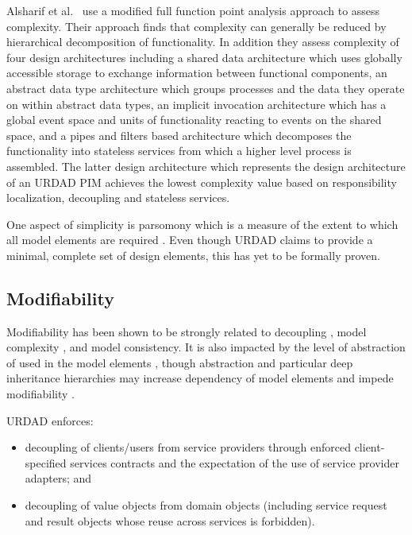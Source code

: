 Alsharif et al.\ \cite{alsharif_2004:complexityOfSoftwareArchitectures} use a modified full function point analysis approach to assess complexity. Their approach finds that complexity can generally be reduced by hierarchical decomposition of functionality. In addition they assess complexity of four design architectures including a shared data architecture which uses globally accessible storage to exchange information between functional components, an abstract data type architecture which groups processes and the data they operate on within abstract data types, an implicit invocation architecture which has a global event space and units of functionality reacting to events on the shared space, and a pipes and filters based architecture which decomposes the functionality into stateless services from which a higher level process is assembled. The latter design architecture which represents the design architecture of an URDAD PIM achieves the lowest complexity value based on responsibility localization, decoupling and stateless services.

One aspect of simplicity is parsomony which is a measure of the extent to which all model elements are required \cite{mohagheghi_2008:overviewOfQualityFrameworks}. Even though URDAD claims to provide a minimal, complete set of design elements, this has yet to be formally proven.


\subsection{Modifiability}

Modifiability has been shown to be strongly related to decoupling
\cite{reynoso_2005:impactOfCouplingOnUnderstandabilityAndModifiability,reynoso_2006:effectOfCouplingOnOclExpressions}, model complexity
\cite{genero_2004:earlyIndicatorsOfUnderstandabilityAndModifiability}, and model consistency. It is also impacted by the level of abstraction of used in the model elements
\cite{verelst_2005:abstractionAndEvolvibility}, though abstraction and particular deep inheritance hierarchies may increase dependency of model elements and impede modifiability
\cite{poels_2001:inheritenceAndModifiability}.

URDAD enforces:
\begin{itemize}
  \item decoupling of clients/users from service providers through enforced client-specified services contracts and the expectation of the use of service provider adapters; and
  \item  decoupling of value objects from domain objects (including service request and result objects whose reuse across services is forbidden).
\end{itemize}

